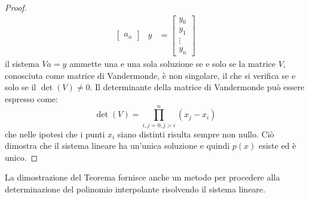 \documentclass{article}
\begin{document}
\begin{proof}
\begin{equation*}
\begin{aligned}
\begin{bmatrix}
               a_n
           \end{bmatrix} &
           y&=\begin{bmatrix}
               y_0 \\ 
               y_1 \\ 
               \vdots \\ 
               y_n
           \end{bmatrix}
       \end{aligned} 
    \end{equation*}
    il sistema $Va=y$ ammette una e una sola soluzione se e solo se la matrice
    $V$, conosciuta come matrice di Vandermonde, è non singolare, il che si
    verifica se e solo se il $\det(V)\neq 0$. Il determinante della matrice di
    Vandermonde può essere espresso come:
    $$\det(V)=\prod_{i,j=0,j>i}^{n}(x_j-x_i)$$ che nelle ipotesi che i punti
    $x_i$ siano distinti risulta sempre non nullo. Ciò dimostra che il sistema
    lineare ha un'unica soluzione e quindi $p(x)$ esiste ed è unico.
\end{proof}
La dimostrazione del Teorema fornisce anche un metodo per procedere alla
determinazione del polinomio interpolante risolvendo il sistema lineare.
\end{document}
